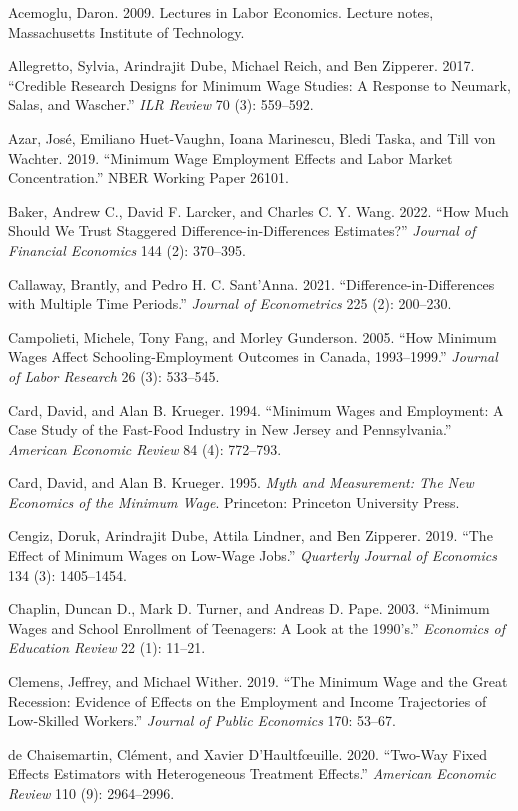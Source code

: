 \documentclass[12pt]{article}
\begin{document}
\noindent Acemoglu, Daron. 2009. Lectures in Labor Economics. Lecture notes, Massachusetts Institute of Technology.

\noindent Allegretto, Sylvia, Arindrajit Dube, Michael Reich, and Ben Zipperer. 2017. ``Credible Research Designs for Minimum Wage Studies: A Response to Neumark, Salas, and Wascher.'' \textit{ILR Review} 70 (3): 559--592.

\noindent Azar, Jos\'e, Emiliano Huet-Vaughn, Ioana Marinescu, Bledi Taska, and Till von Wachter. 2019. ``Minimum Wage Employment Effects and Labor Market Concentration.'' NBER Working Paper 26101.

\noindent Baker, Andrew C., David F. Larcker, and Charles C. Y. Wang. 2022. ``How Much Should We Trust Staggered Difference-in-Differences Estimates?'' \textit{Journal of Financial Economics} 144 (2): 370--395.

\noindent Callaway, Brantly, and Pedro H. C. Sant'Anna. 2021. ``Difference-in-Differences with Multiple Time Periods.'' \textit{Journal of Econometrics} 225 (2): 200--230.

\noindent Campolieti, Michele, Tony Fang, and Morley Gunderson. 2005. ``How Minimum Wages Affect Schooling-Employment Outcomes in Canada, 1993--1999.'' \textit{Journal of Labor Research} 26 (3): 533--545.

\noindent Card, David, and Alan B. Krueger. 1994. ``Minimum Wages and Employment: A Case Study of the Fast-Food Industry in New Jersey and Pennsylvania.'' \textit{American Economic Review} 84 (4): 772--793.

\noindent Card, David, and Alan B. Krueger. 1995. \textit{Myth and Measurement: The New Economics of the Minimum Wage}. Princeton: Princeton University Press.

\noindent Cengiz, Doruk, Arindrajit Dube, Attila Lindner, and Ben Zipperer. 2019. ``The Effect of Minimum Wages on Low-Wage Jobs.'' \textit{Quarterly Journal of Economics} 134 (3): 1405--1454.

\noindent Chaplin, Duncan D., Mark D. Turner, and Andreas D. Pape. 2003. ``Minimum Wages and School Enrollment of Teenagers: A Look at the 1990's.'' \textit{Economics of Education Review} 22 (1): 11--21.

\noindent Clemens, Jeffrey, and Michael Wither. 2019. ``The Minimum Wage and the Great Recession: Evidence of Effects on the Employment and Income Trajectories of Low-Skilled Workers.'' \textit{Journal of Public Economics} 170: 53--67.

\noindent de Chaisemartin, Cl\'ement, and Xavier D'Haultf{\oe}uille. 2020. ``Two-Way Fixed Effects Estimators with Heterogeneous Treatment Effects.'' \textit{American Economic Review} 110 (9): 2964--2996.
\end{document}
